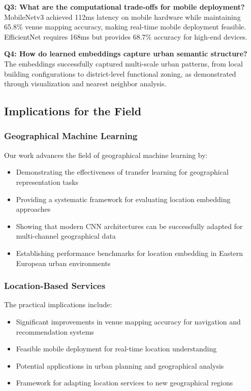 {{{{{\textbf{Q3: What are the computational trade-offs for mobile deployment?}
MobileNetv3 achieved 112ms latency on mobile hardware while maintaining 65.8\% venue mapping accuracy, making real-time mobile deployment feasible. EfficientNet requires 168ms but provides 68.7\% accuracy for high-end devices.

\textbf{Q4: How do learned embeddings capture urban semantic structure?}
The embeddings successfully captured multi-scale urban patterns, from local building configurations to district-level functional zoning, as demonstrated through visualization and nearest neighbor analysis.

\subsection{Implications for the Field}

\subsubsection{Geographical Machine Learning}

Our work advances the field of geographical machine learning by:
\begin{itemize}
    \item Demonstrating the effectiveness of transfer learning for geographical representation tasks
    \item Providing a systematic framework for evaluating location embedding approaches
    \item Showing that modern CNN architectures can be successfully adapted for multi-channel geographical data
    \item Establishing performance benchmarks for location embedding in Eastern European urban environments
\end{itemize}

\subsubsection{Location-Based Services}

The practical implications include:
\begin{itemize}
    \item Significant improvements in venue mapping accuracy for navigation and recommendation systems
    \item Feasible mobile deployment for real-time location understanding
    \item Potential applications in urban planning and geographical analysis
    \item Framework for adapting location services to new geographical regions
\end{itemize}

}}}}}
